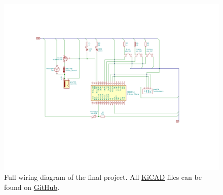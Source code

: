 \begin{figure}[h!]
    \centering
    \includegraphics[width=\textwidth]{graphics/appendix/diagram_full_assembly.pdf}
    \caption{Full wiring diagram of the final project. All \href{https://www.kicad.org/}{KiCAD} files can be found on \href{https://github.com/galactic-forensics/workshop_arduino_electronics/tree/main/kicad}{GitHub}.}
    \label{fig:appendix:full_wiring_diagram}
\end{figure}
